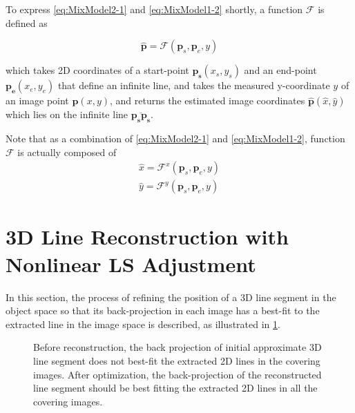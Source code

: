To express \eqref{eq:MixModel2-1} and \eqref{eq:MixModel1-2} shortly, a function $\mathcal{F}$ is defined as

\begin{equation} \label{eq:Ffunction}
\hat{\mathbf{p}} = \mathcal{F}(\mathbf{p}_s,\mathbf{p}_e,y)
\end{equation}

which takes 2D coordinates of a start-point $\mathbf{p_s}(x_s,y_s)$ and an end-point $\mathbf{p_e}(x_e,y_e)$ that define an infinite line, and takes the measured y-coordinate $y$ of an image point $\mathbf{p}(x,y)$, and returns the estimated image coordinates $\mathbf{\hat{p}}(\hat{x},\hat{y})$ which lies on the infinite line $\overline{\mathbf{p_s}\mathbf{p_s}}$.

Note that as a combination of \eqref{eq:MixModel2-1} and \eqref{eq:MixModel1-2}, function $\mathcal{F}$ is actually composed of
\begin{equation} \label{eq:Ffunction_xy}
\begin{split}
\hat{x} = \mathcal{F}^x(\mathbf{p}_s,\mathbf{p}_e,y)\\
\hat{y} = \mathcal{F}^y(\mathbf{p}_s,\mathbf{p}_e,y)
\end{split}
\end{equation}

\clearpage
\section{3D Line Reconstruction with Nonlinear LS Adjustment}
\label{sec:LSadj}

In this section, the process of refining the position of a 3D line segment in the object space so that its back-projection in each image has a best-fit to the extracted line in the image space is described, as illustrated in \cref{fig:mainidea}.

\begin{figure}
	\centering
	
	\caption{\small Before reconstruction, the back projection of initial approximate 3D line segment does not best-fit the extracted 2D lines in the covering images. After optimization, the back-projection of the reconstructed line segment should be best fitting the extracted 2D lines in all the covering images.}
	\label{fig:mainidea}
\end{figure}


